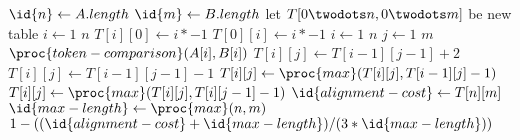 \begin{codebox}
\li $\id{n} \gets A.length$
\li $\id{m} \gets B.length$
\li let $T[0 \twodots n, 0 \twodots m]$ be new table
\li \For $i \gets 1$ \To $n$
\li \Do $T[i][0] \gets i * -1$
\li $T[0][i] \gets i * -1$ \End
\li \For $i \gets 1$ \To $n$
\li \Do \For $j \gets 1$ \To $m$
\li \Do \If $\proc{token-comparison}(A[i], B[i])$
\li \Then $T[i][j] \gets T[i - 1][j - 1] + 2$
\li \Else
\li $T[i][j] \gets T[i - 1][j - 1] - 1$ \End
\li $T[i][j] \gets \proc{max}(T[i][j],T[i-1][j]-1)$
\li $T[i][j] \gets \proc{max}(T[i][j],T[i][j-1]-1)$ \End \End
\li $\id{alignment-cost} \gets T[n][m]$
\li $\id{max-length} \gets \proc{max}(n, m)$
\li \Return $1 - ((\id{alignment-cost}+\id{max-length})/(3*\id{max-length}))$
\end{codebox}